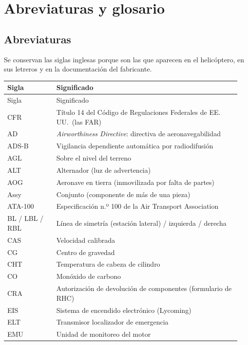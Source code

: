 \chapter{Abreviaturas y glosario}
\label{ap:abreviaturas}

\section{Abreviaturas}

Se conservan las siglas inglesas porque son las que aparecen en el helicóptero, en sus letreros y en la documentación del fabricante.

{\small
\begin{longtable}{@{}>{\raggedright\arraybackslash}p{0.2\linewidth}>{\raggedright\arraybackslash}p{0.75\linewidth}@{}}
\toprule
Sigla & Significado \\
\midrule
\endfirsthead
\toprule
Sigla & Significado \\
\midrule
\endhead
\bottomrule
\endfoot
14 CFR & Título 14 del Código de Regulaciones Federales de EE.\,UU.\ (las FAR) \\
AD & \emph{Airworthiness Directive}: directiva de aeronavegabilidad \\
ADS-B & Vigilancia dependiente automática por radiodifusión \\
AGL & Sobre el nivel del terreno \\
ALT & Alternador (luz de advertencia) \\
AOG & Aeronave en tierra (inmovilizada por falta de partes) \\
Assy & Conjunto (componente de más de una pieza) \\
ATA-100 & Especificación n.º 100 de la Air Transport Association \\
BL / LBL / RBL & Línea de simetría (estación lateral) / izquierda / derecha \\
CAS & Velocidad calibrada \\
CG & Centro de gravedad \\
CHT & Temperatura de cabeza de cilindro \\
CO & Monóxido de carbono \\
CRA & Autorización de devolución de componentes (formulario de RHC) \\
EIS & Sistema de encendido electrónico (Lycoming) \\
ELT & Transmisor localizador de emergencia \\
EMU & Unidad de monitoreo del motor \\

\end{longtable}}
